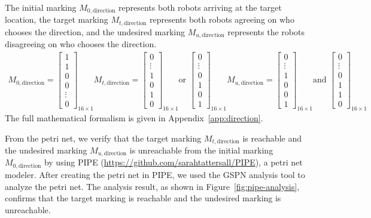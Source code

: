 \documentclass[12pt,a4paper]{article}
\begin{document}
The initial marking $M_{0, \text{direction}}$ represents both robots arriving at the target location, the target marking $M_{t, \text{direction}}$ represents both robots agreeing on who chooses the direction, and the undesired marking $M_{u, \text{direction}}$ represents the robots disagreeing on who chooses the direction.
\begin{align*}
    M_{0, \text{direction}} = \begin{bmatrix}
        1 \\ 1 \\ 0 \\ 0 \\ \vdots \\ 0
    \end{bmatrix}_{16 \times 1}
    M_{t, \text{direction}} = \begin{bmatrix}
        0 \\ \vdots \\ 1 \\ 0 \\ 1 \\ 0
    \end{bmatrix}_{16 \times 1} \text{or } 
    \begin{bmatrix}
        0 \\ \vdots \\ 0 \\ 1 \\ 0 \\ 1
    \end{bmatrix}_{16 \times 1}
    M_{u, \text{direction}} = \begin{bmatrix}
        0 \\ \vdots \\ 1 \\ 0 \\ 0 \\ 1
    \end{bmatrix}_{16 \times 1} \text{and } 
    \begin{bmatrix}
        0 \\ \vdots \\ 0 \\ 1 \\ 1 \\ 0
    \end{bmatrix}_{16 \times 1}
\end{align*}
The full mathematical formalism is given in Appendix~\ref{app:direction}.

From the petri net, we verify that the target marking $M_{t, \text{direction}}$ is reachable and the undesired marking $M_{u, \text{direction}}$ is unreachable from the initial marking $M_{0, \text{direction}}$ by using PIPE (\url{https://github.com/sarahtattersall/PIPE}), a petri net modeler. After creating the petri net in PIPE, we used the GSPN analysis tool to analyze the petri net. The analysis result, as shown in Figure~\ref{fig:pipe-analysis}, confirms that the target marking is reachable and the undesired marking is unreachable. 
\end{document}
